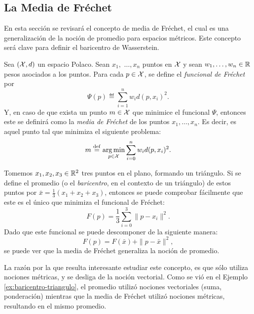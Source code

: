 {{	  \subsection*{La Media de Fréchet}\label{ssec:la-media-de-Frechet}
	  {
		  En esta sección se revisará el concepto de media de Fréchet, el cual es una generalización de la noción de promedio para espacios métricos. Este concepto será clave para definir el baricentro de Wasserstein.
		  \begin{definition}
			  Sea $(\mathcal{X}, d)$ un espacio Polaco. Sean $x_1,$ $\ldots, x_n$ puntos en $\mathcal{X}$ y sean $w_1,\ldots,w_n\in\mathbb{R}$ pesos asociados a los puntos. Para cada $p\in\mathcal{X}$, se define el \emph{funcional de Fréchet} por
			  \begin{equation}
				  \label{eq:funcionalFrechet}
				  \Psi(p) \eqdef \sum_{i=1}^{n} w_i d(p, x_i)^2.
			  \end{equation}
			  Y, en caso de que exista un punto $m \in \mathcal{X}$ que minimice el funcional $\Psi$, entonces este se definirá como la \emph{media de Fréchet} de los puntos $x_1,\ldots, x_n$. Es decir, es aquel punto tal que minimiza el siguiente problema:
			  \begin{equation}
				  \label{eq:mediaFrechet}
				  m \stackrel{\mathrm{def}}{=} \operatorname*{arg\,m{i}n}_{p \in \mathcal{X}} \sum_{i=0}^{n} w_i d(p, x_i)^2.
			  \end{equation}
		  \end{definition}

		  \begin{example}\label{ex:baricentro-triangulo}
			  Tomemos $x_1, x_2, x_3 \in \mathbb{R}^2$ tres puntos en el plano, formando un triángulo. Si se define el promedio (o el \textit{baricentro}, en el contexto de un triángulo) de estos puntos por $\bar x = \frac{1}{3} (x_1 + x_2 + x_3)$, entonces se puede comprobar fácilmente que este es el único que minimiza el funcional de Fréchet:
			  \begin{equation}
				  F(p) = \frac{1}{3} \sum_{i=0}^{3} \|p - x_i\|^2.
			  \end{equation}
			  Dado que este funcional se puede descomponer de la siguiente manera:
			  \begin{equation}
				  F(p) = F(\bar x) + \|p-\bar x\|^2,
			  \end{equation}
			  se puede ver que la media de Fréchet generaliza la noción de promedio.
		  \end{example}

		  \begin{remark}
			  La razón por la que resulta interesante estudiar este concepto, es que sólo utiliza nociones métricas, y se desliga de la noción vectorial. Como se vió en el Ejemplo \ref{ex:baricentro-triangulo}, el promedio utilizó nociones vectoriales (suma, ponderación) mientras que la media de Fréchet utilizó nociones métricas, resultando en el mismo promedio.


\end{remark}}}}
